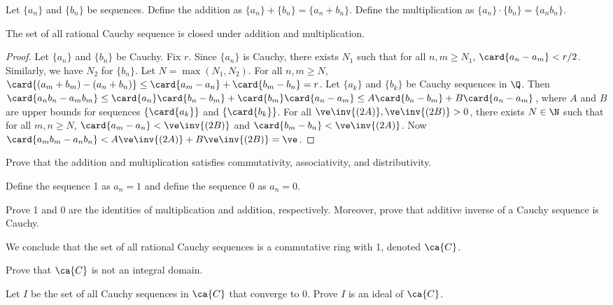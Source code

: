 \documentclass[10pt]{article}
\begin{document}
\par
Let $\{{a}_{n}\}$ and $\{{b}_{n}\}$ be sequences. Define the addition as $\{{a}_{n}\}+\{{b}_{n}\}=\{{a}_{n}+{b}_{n}\}$. Define the multiplication as $\{{a}_{n}\}\cdot\{{b}_{n}\}=\{{a}_{n}{b}_{n}\}$. 
\begin{proposition}
    The set of all rational Cauchy sequence is closed under addition and multiplication.
\end{proposition}
\begin{proof}
    Let $\{{a}_{n}\}$ and $\{{b}_{n}\}$ be Cauchy. Fix $r$. Since $\{{a}_{n}\}$ is Cauchy, there exists ${N}_{1}$ such that for all $n,m\ge{N}_{1}$, $\card{{a}_{n}-{a}_{m}}<r/2$. Similarly, we have ${N}_{2}$ for $\{{b}_{n}\}$. Let $N=\max({N}_{1},{N}_{2})$. For all $n,m\ge N$, $\card{({a}_{m}+{b}_{m})-({a}_{n}+{b}_{n})}\le\card{{a}_{m}-{a}_{n}}+\card{{b}_{m}-{b}_{n}}=r$. Let $\{{a}_{k}\}$ and $\{{b}_{k}\}$ be Cauchy sequences in $\Q$. Then $\card{{a}_{n}{b}_{n}-{a}_{m}{b}_{m}}\le\card{{a}_{n}}\card{{b}_{n}-{b}_{m}}+\card{{b}_{m}}\card{{a}_{n}-{a}_{m}}\le A\card{{b}_{n}-{b}_{m}}+B\card{{a}_{n}-{a}_{m}}$, where $A$ and $B$ are upper bounds for sequences $\{\card{{a}_{k}}\}$ and $\{\card{{b}_{k}}\}$. For all $\ve\inv{(2A)},\ve\inv{(2B)}>0$, there exists $N\in \N$ such that for all $m,n\ge N$, $\card{{a}_{m}-{a}_{n}}<\ve\inv{(2B)}$ and $\card{{b}_{m}-{b}_{n}}<\ve\inv{(2A)}$. Now $\card{{a}_{m}{b}_{m}-{a}_{n}{b}_{n}}<A\ve\inv{(2A)}+B\ve\inv{(2B)}= \ve$.
\end{proof}
\begin{problem}
    Prove that the addition and multiplication satisfies commutativity, associativity, and distributivity.
\end{problem}
\par
Define the sequence 1 as ${a}_{n}=1$ and define the sequence 0 as ${a}_{n}=0$.
\begin{problem}
    Prove 1 and 0 are the identities of multiplication and addition, respectively. Moreover, prove that additive inverse of a Cauchy sequence is Cauchy.
\end{problem}
\par
We conclude that the set of all rational Cauchy sequences is a commutative ring with 1, denoted $\ca{C}$.
\begin{problem}
    Prove that $\ca{C}$ is not an integral domain.
\end{problem}
\begin{problem}
    Let $I$ be the set of all Cauchy sequences in $\ca{C}$ that converge to 0. Prove $I$ is an ideal of $\ca{C}$.
\end{problem}
\end{document}
